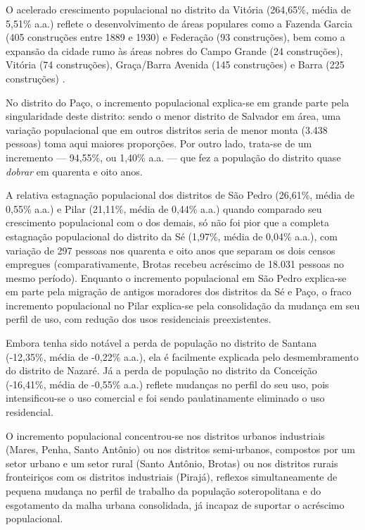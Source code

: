 O acelerado crescimento populacional no distrito da Vitória (264,65\%, média de 5,51\% a.a.) reflete o desenvolvimento de áreas populares como a Fazenda Garcia (405 construções entre 1889 e 1930) e Federação (93 construções), bem como a expansão da cidade rumo às áreas nobres do Campo Grande (24 construções), Vitória (74 construções), Graça/Barra Avenida (145 construções) e Barra (225 construções) \cite[p.~295]{almeida_victoria_1997}.

No distrito do Paço, o incremento populacional explica-se em grande parte pela singularidade deste distrito: sendo o menor distrito de Salvador em área, uma variação populacional que em outros distritos seria de menor monta (3.438 pessoas) toma aqui maiores proporções. Por outro lado, trata-se de um incremento --- 94,55\%, ou 1,40\% a.a. --- que fez a população do distrito quase \textit{dobrar} em quarenta e oito anos.

A relativa estagnação populacional dos distritos de São Pedro (26,61\%, média de 0,55\% a.a.) e Pilar (21,11\%, média de 0,44\% a.a.) quando comparado seu crescimento populacional com o dos demais, só não foi pior que a completa estagnação populacional do distrito da Sé (1,97\%, média de 0,04\% a.a.), com variação de 297 pessoas nos quarenta e oito anos que separam os dois censos empregues (comparativamente, Brotas recebeu acréscimo de 18.031 pessoas no mesmo período). Enquanto o incremento populacional em São Pedro explica-se em parte pela migração de antigos moradores dos distritos da Sé e Paço, o fraco incremento populacional no Pilar explica-se pela consolidação da mudança em seu perfil de uso, com redução dos usos residenciais preexistentes.

Embora tenha sido notável a perda de população no distrito de Santana (-12,35\%, média de -0,22\% a.a.), ela é facilmente explicada pelo desmembramento do distrito de Nazaré. Já a perda de população no distrito da Conceição (-16,41\%, média de -0,55\% a.a.) reflete mudanças no perfil do seu uso, pois intensificou-se o uso comercial e foi sendo paulatinamente eliminado o uso residencial.

O incremento populacional concentrou-se nos distritos urbanos industriais (Mares, Penha, Santo Antônio) ou nos distritos semi-urbanos, compostos por um setor urbano e um setor rural (Santo Antônio, Brotas) ou nos distritos rurais fronteiriços com os distritos industriais (Pirajá), reflexos simultaneamente de pequena mudança no perfil de trabalho da população soteropolitana e do esgotamento da malha urbana consolidada, já incapaz de suportar o acréscimo populacional.

